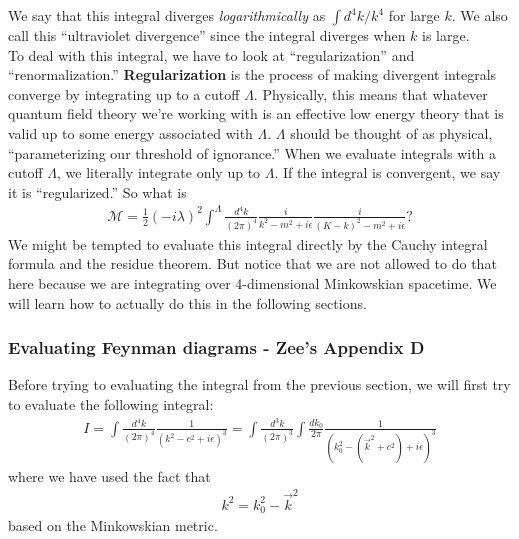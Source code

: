 \documentclass{book}
\theoremstyle{definition}
\newcommand{\f}[2]{\frac{#1}{#2}}
\begin{document}
We say that this integral diverges \textit{logarithmically} as $\int d^4k/k^4$ for large $k$. We also call this ``ultraviolet divergence'' since the integral diverges when $k$ is large. \\

To deal with this integral, we have to look at ``regularization'' and ``renormalization.'' \textbf{Regularization} is the process of making divergent integrals converge by integrating up to a cutoff $\Lambda$. Physically, this means that whatever quantum field theory we're working with is an effective low energy theory that is valid up to some energy associated with $\Lambda$.  $\Lambda$ should be thought of as physical, ``parameterizing our threshold of ignorance.'' When we evaluate integrals with a cutoff $\Lambda$, we literally integrate only up to $\Lambda$. If the integral is convergent, we say it is ``regularized.'' So what is
\begin{align}
\mathcal{M} = \f{1}{2}(-i\lambda)^2\int^\Lambda \f{d^4k}{(2\pi)^4}\f{i}{k^2 - m^2 + i\epsilon}\f{i}{(K - k)^2 - m^2 + i\epsilon}?
\end{align}
We might be tempted to evaluate this integral directly by the Cauchy integral formula and the residue theorem. But notice that we are not allowed to do that here because we are integrating over 4-dimensional Minkowskian spacetime. We will learn how to actually do this in the following sections.


\subsubsection{Evaluating Feynman diagrams - Zee's Appendix D}

Before trying to evaluating the integral from the previous section, we will first try to evaluate the following integral:
\begin{align}
\boxed{I = \int \f{d^4k}{(2\pi)^4} \f{1}{(k^2 - c^2+ i\epsilon)^3} = \int \f{d^3k}{(2\pi)^3}\int \f{dk_0}{2\pi} \f{1}{(k_0^2 - (\vec{k}^2 + c^2)+ i\epsilon)^3}} 
\end{align}
where we have used the fact that
\begin{align}
k^2 = k_0^2 - \vec{k}^2
\end{align}
based on the Minkowskian metric. \\
\end{document}
